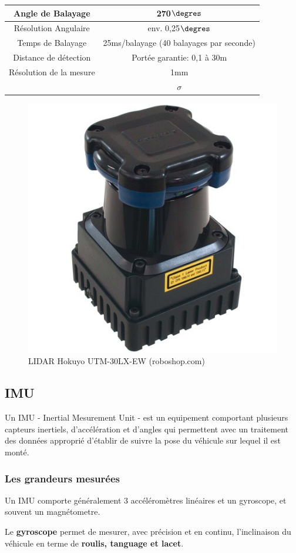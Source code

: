 \documentclass[12pt,a4paper]{report}
\begin{document}
		
		\begin{tabular}{|c|c|}
			\hline 
			Angle de Balayage & 270$\degres$ \\ 
			\hline 
			Résolution Angulaire & env. 0,25$\degres$ \\ 
			\hline
			Temps de Balayage & 25ms/balayage (40 balayages par seconde) \\
			\hline
			Distance de détection & Portée garantie: 0,1 à 30m \\
			\hline
			Résolution de la mesure & 1mm \\
			& $\sigma$ \\
			\hline
		\end{tabular} 
	
		\begin{figure}[h!]
			\centering
			\includegraphics[width=0.3\linewidth]{img/hokuyo-utm-30lx-ew-scanning-laser-rangefinder}
			\caption[hokuyo]{LIDAR Hokuyo UTM-30LX-EW (roboshop.com)}
			\label{fig:hokuyo-utm-30lx-ew-scanning-laser-rangefinder}
		\end{figure}
	
		
		\subsection{IMU}
		Un IMU - Inertial Mesurement Unit - est un equipement comportant plusieurs capteurs inertiels, d'accélération et d'angles qui permettent avec un traitement des données approprié d'établir de suivre la pose du véhicule sur lequel il est monté.
		
		\subsubsection{Les grandeurs mesurées}
		Un IMU comporte généralement 3 accéléromètres linéaires et un gyroscope, et souvent un magnétometre.
		
		\para Le \textbf{gyroscope} permet de mesurer, avec précision et en continu, l'inclinaison du véhicule en terme de \textbf{roulis, tanguage et lacet}. 
		
\end{document}
